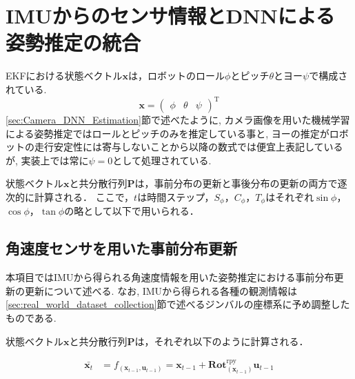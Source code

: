 \section{IMUからのセンサ情報とDNNによる姿勢推定の統合}

EKF\cite{EKF_paper}における状態ベクトル\(\bm{x}\)は，ロボットのロール\(\phi\)とピッチ\(\theta\)とヨー\(\psi\)で構成されている.
%
\begin{equation}
	\bm{x}
	=
	\begin{pmatrix}
		\phi & \theta & \psi
	\end{pmatrix}
	^\mathrm{T}
\end{equation}
%
\ref{sec:Camera_DNN_Estimation}節で述べたように, カメラ画像を用いた機械学習による姿勢推定ではロールとピッチのみを推定している事と, ヨーの推定がロボットの走行安定性には寄与しないことから以降の数式では便宜上表記しているが, 実装上では常に$\psi=0$として処理されている.\par
状態ベクトル\(\bm{x}\)と共分散行列\(\bm{P}\)は，事前分布の更新と事後分布の更新の両方で逐次的に計算される．
%
%
ここで，\(t\)は時間ステップ，\(S_{\phi}\)，\(C_{\phi}\)，\(T_{\phi}\)はそれぞれ\(\sin{\phi}\)，\(\cos{\phi}\)，\(\tan{\phi}\)の略として以下で用いられる．%

\subsection{角速度センサを用いた事前分布更新}\label{sec:ekf_gyro}
本項目ではIMUから得られる角速度情報を用いた姿勢推定における事前分布更新の更新について述べる. なお, IMUから得られる各種の観測情報は\ref{sec:real_world_dataset_collection}節で述べるジンバルの座標系に予め調整したものである.\par
状態ベクトル\(\bm{x}\)と共分散行列\(\bm{P}\)は，それぞれ以下のように計算される．
%

\begin{equation}
	\begin{split}
		\bar{\bm{x}_{t}}
		&=
		f_{(\bm{x}_{t-1}, \bm{u}_{t-1})}
		=
		\bm{x}_{t-1} + \bm{Rot}^\mathrm{rpy}_{(\bm{x}_{t-1})} \bm{u}_{t-1}
\end{split}
\end{equation}

